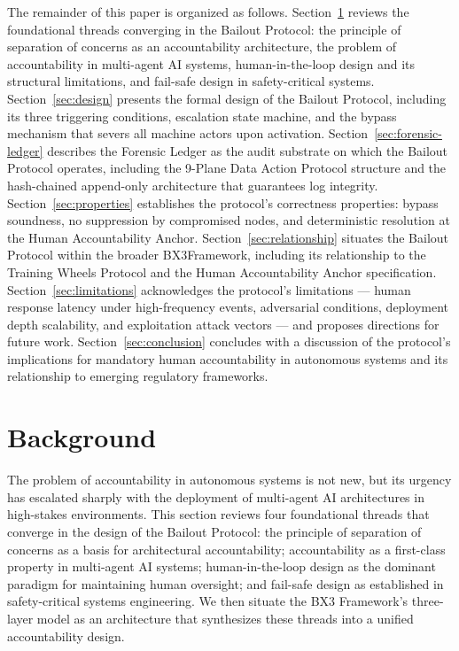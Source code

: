 \documentclass[12pt]{article}
\newcommand{\bxthree}{\mbox{BX3}}
\begin{document}
The remainder of this paper is organized as follows. Section~\ref{sec:background} reviews the foundational threads converging in the Bailout Protocol: the principle of separation of concerns as an accountability architecture, the problem of accountability in multi-agent AI systems, human-in-the-loop design and its structural limitations, and fail-safe design in safety-critical systems. Section~\ref{sec:design} presents the formal design of the Bailout Protocol, including its three triggering conditions, escalation state machine, and the bypass mechanism that severs all machine actors upon activation. Section~\ref{sec:forensic-ledger} describes the Forensic Ledger as the audit substrate on which the Bailout Protocol operates, including the 9-Plane Data Action Protocol structure and the hash-chained append-only architecture that guarantees log integrity. Section~\ref{sec:properties} establishes the protocol's correctness properties: bypass soundness, no suppression by compromised nodes, and deterministic resolution at the Human Accountability Anchor. Section~\ref{sec:relationship} situates the Bailout Protocol within the broader \bxthree Framework, including its relationship to the Training Wheels Protocol and the Human Accountability Anchor specification. Section~\ref{sec:limitations} acknowledges the protocol's limitations — human response latency under high-frequency events, adversarial conditions, deployment depth scalability, and exploitation attack vectors — and proposes directions for future work. Section~\ref{sec:conclusion} concludes with a discussion of the protocol's implications for mandatory human accountability in autonomous systems and its relationship to emerging regulatory frameworks.


\section{Background}
\label{sec:background}

The problem of accountability in autonomous systems is not new, but its urgency has escalated sharply with the deployment of multi-agent AI architectures in high-stakes environments. This section reviews four foundational threads that converge in the design of the Bailout Protocol: the principle of separation of concerns as a basis for architectural accountability; accountability as a first-class property in multi-agent AI systems; human-in-the-loop design as the dominant paradigm for maintaining human oversight; and fail-safe design as established in safety-critical systems engineering. We then situate the BX3 Framework's three-layer model as an architecture that synthesizes these threads into a unified accountability design.
\end{document}
